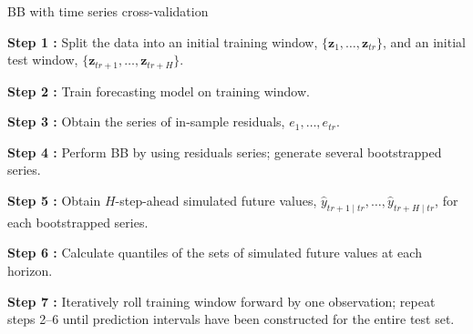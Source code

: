 \documentclass[
  12pt,
  ignorenonframetext,
  aspectratio=169,
]{beamer}
\begin{document}
\begin{frame}{BB with time series cross-validation}
\label{bb-with-time-series-cross-validation-1}
\begin{block}{}
\fontsize{9}{9}\sf
\color{blue} \textbf{Step 1 :} \color{black} Split the data into an initial training window, $\{\bm{z}_{1}, \dots, \bm{z}_{tr}\}$, and an initial test window, $\{\bm{z}_{tr + 1}, \dots, \bm{z}_{tr + H}\}$.
\end{block}

\begin{block}{}
\fontsize{9}{9}\sf
\color{violet} \textbf{Step 2 :} \color{black} Train forecasting model on training window.
\end{block}

\begin{block}{}
\fontsize{9}{9}\sf
\color{blue} \textbf{Step 3 :} \color{black} Obtain the series of in-sample residuals, $e_{1}, \dots, e_{tr}$.
\end{block}

\begin{block}{}
\fontsize{9}{9}\sf
\color{violet} \textbf{Step 4 :} \color{black} Perform BB by using residuals series; generate several bootstrapped series.
\end{block}

\begin{block}{}
\fontsize{9}{9}\sf
\color{blue} \textbf{Step 5 :} \color{black} Obtain $H$-step-ahead simulated future values, $\hat{y}_{tr + 1 \mid tr}, \dots, \hat{y}_{tr + H \mid tr}$, for each bootstrapped series.
\end{block}

\begin{block}{}
\fontsize{9}{9}\sf
\color{violet} \textbf{Step 6 :} \color{black} Calculate quantiles of the sets of simulated future values at each horizon.
\end{block}

\begin{block}{}
\fontsize{9}{9}\sf
\color{blue} \textbf{Step 7 :} \color{black} Iteratively roll training window forward by one observation; repeat steps 2--6 until prediction intervals have been constructed for the entire test set.
\end{block}
\end{frame}
\end{document}
